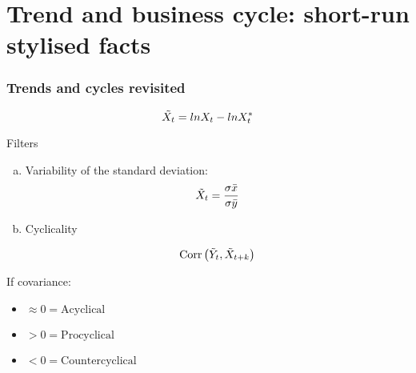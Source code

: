 \section{Trend and business cycle: short-run stylised facts}


\subsubsection{Trends and cycles revisited}

\begin{center}
\end{center}

$$
\Tilde{X_t} = ln X_t - ln X_{t}^{*}
$$

Filters

\begin{enumerate}[a)]
    \item Variability of the standard deviation:
    $$
        \Tilde{X}_t = \frac{\sigma \Bar{x}}{\sigma \Bar{y}}
    $$
    
    \item
    Cyclicality 
    
    $$
    \text{Corr}\left( \Tilde{Y}_t, \Tilde{X}_{t + k} \right)
    $$
\end{enumerate}

    If covariance:
    \begin{itemize}
        \item     $\approx 0 = \text{Acyclical}$
        \item $ > 0 = \text{Procyclical}$
        \item $ < 0 = \text{Countercyclical}$
    \end{itemize}